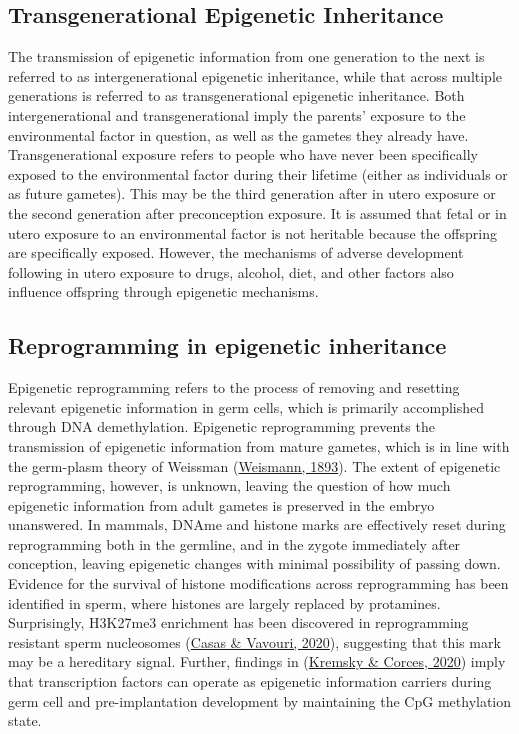 \documentclass[12pt,twoside]{reedthesis}
\begin{document}
\hypertarget{tei}{%
\subsection*{Transgenerational Epigenetic Inheritance}\label{tei}}

The transmission of epigenetic information from one generation to the
next is referred to as intergenerational epigenetic inheritance, while
that across multiple generations is referred to as transgenerational
epigenetic inheritance. Both intergenerational and transgenerational
imply the parents' exposure to the environmental factor in question, as
well as the gametes they already have. Transgenerational exposure refers
to people who have never been specifically exposed to the environmental
factor during their lifetime (either as individuals or as future
gametes). This may be the third generation after in utero exposure or
the second generation after preconception exposure. It is assumed that
fetal or in utero exposure to an environmental factor is not heritable
because the offspring are specifically exposed. However, the mechanisms
of adverse development following in utero exposure to drugs, alcohol,
diet, and other factors also influence offspring through epigenetic
mechanisms.

\hypertarget{reprogramming-in-epigenetic-inheritance}{%
\subsection*{Reprogramming in epigenetic inheritance}\label{reprogramming-in-epigenetic-inheritance}}

Epigenetic reprogramming refers to the process of removing and resetting
relevant epigenetic information in germ cells, which is primarily
accomplished through DNA demethylation. Epigenetic reprogramming
prevents the transmission of epigenetic information from mature gametes,
which is in line with the germ-plasm theory of Weissman (\protect\hyperlink{ref-weismann1893}{Weismann, 1893}).
The extent of epigenetic reprogramming, however, is unknown, leaving the
question of how much epigenetic information from adult gametes is
preserved in the embryo unanswered. In mammals, DNAme and histone marks
are effectively reset during reprogramming both in the germline, and in
the zygote immediately after conception, leaving epigenetic changes with
minimal possibility of passing down. Evidence for the survival of
histone modifications across reprogramming has been identified in sperm,
where histones are largely replaced by protamines. Surprisingly,
H3K27me3 enrichment has been discovered in reprogramming resistant sperm
nucleosomes (\protect\hyperlink{ref-casas2020}{Casas \& Vavouri, 2020}), suggesting that this mark may be a hereditary
signal. Further, findings in (\protect\hyperlink{ref-kremsky2020}{Kremsky \& Corces, 2020}) imply that transcription
factors can operate as epigenetic information carriers during germ cell
and pre-implantation development by maintaining the CpG methylation
state.
\end{document}
